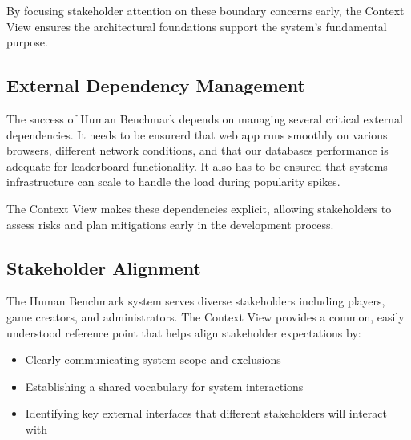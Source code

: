 
By focusing stakeholder attention on these boundary concerns early, the Context
View ensures the architectural foundations support the system's fundamental
purpose.


\subsection{External Dependency Management}

The success of Human Benchmark depends on managing several critical external dependencies.
It needs to be ensurerd that web app runs smoothly on various
browsers, different network conditions, and that our databases performance is 
adequate for leaderboard functionality. It also has to be ensured
that systems infrastructure can scale to handle the load during popularity spikes.


The Context View makes these dependencies explicit, allowing stakeholders to assess risks and plan mitigations early in the development process.



\subsection{Stakeholder Alignment}

The Human Benchmark system serves diverse stakeholders including players, 
game creators, and administrators. The Context View provides a common, 
easily understood reference point that helps align stakeholder expectations by:

\begin{itemize}
    \item Clearly communicating system scope and exclusions
    \item Establishing a shared vocabulary for system interactions
    \item Identifying key external interfaces that different stakeholders will interact with
\end{itemize}

